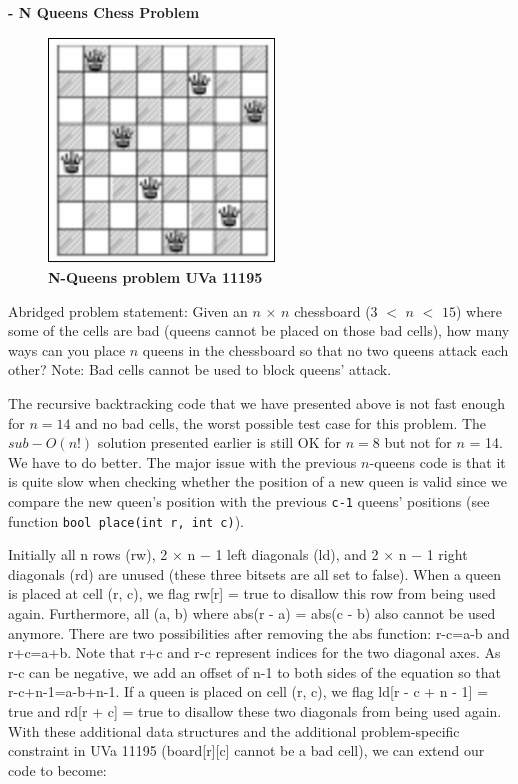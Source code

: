 \href{https://vj.z180.cn/7e4e8d92abc27cb470b49794bd31bb31?v=1575831964}{}\textbf{ - N Queens Chess Problem}

\begin{figure}[h]
    \centering
\includegraphics[width=6cm, height=6cm]{n-queen-problem.png}
 \caption{\textbf{N-Queens problem UVa 11195}}
    \label{fig:n-queen-problem}
\end{figure}

Abridged problem statement: Given an $n$ × $n$ chessboard ($3$ $<$ $n$ $<$ $15$) where some of the cells are bad (queens cannot be placed on those bad cells), how many ways can you place $n$ queens in the chessboard so that no two queens attack each other? Note: Bad cells cannot be used to block queens’ attack.

\hspace{7mm}The recursive backtracking code that we have presented above is not fast enough for $n = 14$ and no bad cells, the worst possible test case for this problem. The $sub-O(n!)$ solution presented earlier is still OK for $n = 8$ but not for $n$ = 14. We have to do better. The major issue with the previous $n$-queens code is that it is quite slow when checking whether the position of a new queen is valid since we compare the new queen’s position with the previous \lstinline|c-1| queens’ positions (see function \lstinline|bool place(int r, int c)|).

\hspace{7mm}Initially all n rows (rw), 2 × n − 1 left diagonals (ld), and 2 × n − 1 right diagonals (rd) are unused (these three bitsets are all set to false). When a queen is placed at cell (r, c), we flag rw[r] = true to disallow this row from being used again. Furthermore, all (a, b) where abs(r - a) = abs(c - b) also cannot be used anymore. There are two possibilities after removing the abs function: r-c=a-b and r+c=a+b. Note that r+c and r-c represent indices for the two diagonal axes. As r-c can be negative, we add an offset of n-1 to both sides of the equation so that r-c+n-1=a-b+n-1. If a queen is placed on cell (r, c), we flag ld[r - c + n - 1] = true and rd[r + c] = true to disallow these two diagonals from being used again. With these additional data structures and the additional problem-specific constraint in UVa 11195 (board[r][c] cannot be a bad cell), we can extend our code to become:


